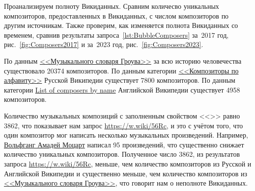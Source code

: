 Проанализируем полноту Викиданных. 
Сравним количесво уникальных композиторов, предоставленных в Викиданных, 
с числом композиторов по другим источникам. 
Также проверим, как изменяется полнота Викиданных со временем, 
сравнив результаты запроса~\ref{lst:BubbleComposers} за~2017 год, 
рис.~\ref{fig:Composers2017} и за~2023 год, рис.~\ref{fig:Composers2023}.

По данным 
\href{https://ru.wikipedia.org/?curid=1362802}
     {<<Музыкального словаря Гроува>>} 
за всю историю человечества существовало \num{20374} композиторов. 
По данным категории 
\href{https://ru.wikipedia.org/?curid=155531}
     {<<Композиторы по алфавиту>>} 
Русской Википедии существует \num{7800} композиторов. 
По данным категории 
\href{https://en.wikipedia.org/?curid=6921880}
     {List of composers by name} 
Английской Википедии существует \num{4958} композиторов.

Количество музыкальных композиций с заполненным свойством <<>> равно \num{3862}, что показывает нам запрос \href{https://w.wiki/56Rc}{https://w.wiki/56Rc}, и это с учётом того, что один композитор мог написать несколько музыкальных произведений. Например, \href{https://ru.wikipedia.org/wiki/Моцарт,_Вольфганг_Амадей}{Вольфганг Амадей Моцарт} написал \num{95} произведений, что существенно снижает количество уникальных композиторов. Полученное число \num{3862}, из результатов запроса \href{https://w.wiki/56Rc}{https://w.wiki/56Rc}, меньше, чем количество композиторов из Русской и Английской Википедии и существенно меньше, чем количество композиторов из \href{https://ru.wikipedia.org/wiki/Музыкальный_словарь_Гроува}{<<Музыкального словаря Гроува>>}, что говорит нам о неполноте Викиданных.

